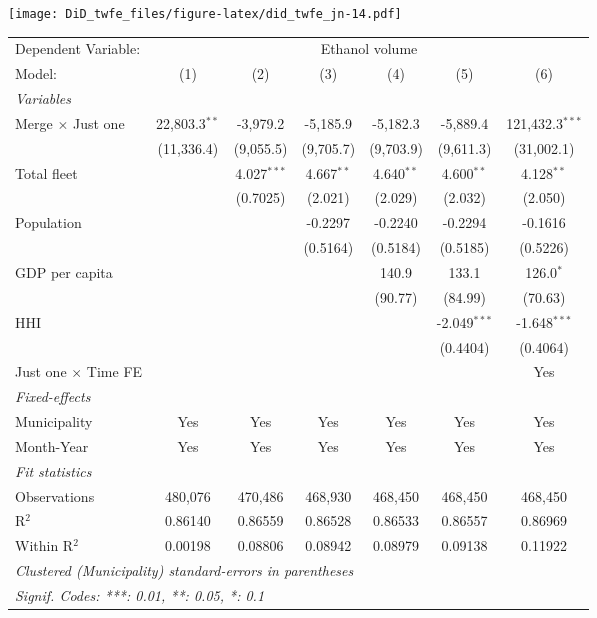 \documentclass[
]{article}
\begin{document}
\texttt{[image: DiD\_twfe\_files/figure-latex/did\_twfe\_jn-14.pdf]}

\begin{tabular}{lcccccc}
\tabularnewline\midrule\midrule
Dependent Variable:&\multicolumn{6}{c}{Ethanol volume}\\
Model:&(1) & (2) & (3) & (4) & (5) & (6)\\
\midrule \emph{Variables}&   &   &   &   &   &  \\
Merge $\times $ Just one & 22,803.3$^{**}$ & -3,979.2 & -5,185.9 & -5,182.3 & -5,889.4 & 121,432.3$^{***}$\\
  &(11,336.4) & (9,055.5) & (9,705.7) & (9,703.9) & (9,611.3) & (31,002.1)\\
Total fleet &    & 4.027$^{***}$ & 4.667$^{**}$ & 4.640$^{**}$ & 4.600$^{**}$ & 4.128$^{**}$\\
  &   & (0.7025) & (2.021) & (2.029) & (2.032) & (2.050)\\
Population &    &    & -0.2297 & -0.2240 & -0.2294 & -0.1616\\
  &   &    & (0.5164) & (0.5184) & (0.5185) & (0.5226)\\
GDP per capita &    &    &    & 140.9 & 133.1 & 126.0$^{*}$\\
  &   &    &    & (90.77) & (84.99) & (70.63)\\
HHI &    &    &    &    & -2.049$^{***}$ & -1.648$^{***}$\\
  &   &    &    &    & (0.4404) & (0.4064)\\
Just one $\times$ Time FE &  &  &  &  &  & Yes\\
\midrule \emph{Fixed-effects}&   &   &   &   &   &  \\
Municipality & Yes & Yes & Yes & Yes & Yes & Yes\\
Month-Year & Yes & Yes & Yes & Yes & Yes & Yes\\
\midrule \emph{Fit statistics}&  & & & & & \\
Observations & 480,076&470,486&468,930&468,450&468,450&468,450\\
R$^2$ & 0.86140&0.86559&0.86528&0.86533&0.86557&0.86969\\
Within R$^2$ & 0.00198&0.08806&0.08942&0.08979&0.09138&0.11922\\
\midrule\midrule\multicolumn{7}{l}{\emph{Clustered (Municipality) standard-errors in parentheses}}\\
\multicolumn{7}{l}{\emph{Signif. Codes: ***: 0.01, **: 0.05, *: 0.1}}\\
\end{tabular}
\end{document}
